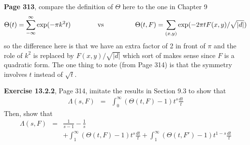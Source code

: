 \documentclass[aps,preprint,preprintnumbers,nofootinbib,showpacs,prd]{revtex4-1}
\newcommand{\nbea}{\begin{eqnarray*}}
\newcommand{\neea}{\end{eqnarray*}}
\begin{document}
{\bf Page 313}, compare the definition of $\Theta$ here to the one in Chapter 9
%
\nbea
\Theta(t) = \sum_{-\infty}^\infty \exp(-\pi k^2t) & {\rm ~~~~~~~~~~~~vs~~~~~~~~~~~} & \Theta(t,F) = \sum_{(x,y)} \exp(-2\pi t F(x,y)/\sqrt{|d|})
\neea
%
so the difference here is that we have an extra factor of 2 in front of $\pi$ and the role of $k^2$ is replaced by $F(x,y)/\sqrt{|d|}$ which sort of makes sense since $F$ is a quadratic form. The one thing to note (from Page 314) is that the symmetry involves $t$ instead of $\sqrt{t}$.

{\bf Exercise 13.2.2}, Page 314, imitate the results in Section 9.3 to show that
%
\nbea
\Lambda(s,F) & = & \int_0^\infty (\Theta(t,F) - 1)t^s \frac{dt}{t}
\neea
%
Then, show that
%
\nbea
\Lambda(s,F) & = & \frac{1}{s-1} - \frac{1}{s} \\
&& + \int_{1}^\infty (\Theta(t,F)-1)t^s\frac{dt}{t} + \int_1^\infty(\Theta(t,F')-1)t^{1-s}\frac{dt}{t}
\neea
%
\end{document}
